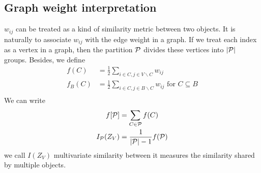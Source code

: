\documentclass{article}
\begin{document}
\subsection{Graph weight interpretation}
$w_{ij}$ can be treated as a kind of similarity metric between two objects. It is naturally to associate $w_{ij}$ with the edge weight in a graph.
If we treat each index as a vertex in a graph, then the partition $\P$ divides these vertices into $\abs{\P}$ groups.  Besides, we define
\begin{align}
f(C) & = \frac{1}{2}\sum_{i\in C, j \in V\backslash C} w_{ij} \\
f_B(C) & = \frac{1}{2}\sum_{i\in C, j \in B\backslash C} w_{ij}  \textrm{  for }C \subseteq B  \\
\end{align}
We can write 
\begin{align}
f[\P] & = \sum_{C \in \P} f(C) \\
I_{\mathcal{P}}(Z_V)  &= \frac{1}{\abs{\P}  - 1}f(\P) 
\end{align}
we call $I(Z_V)$ multivariate similarity between it measures the similarity shared by multiple objects.
\end{document}
